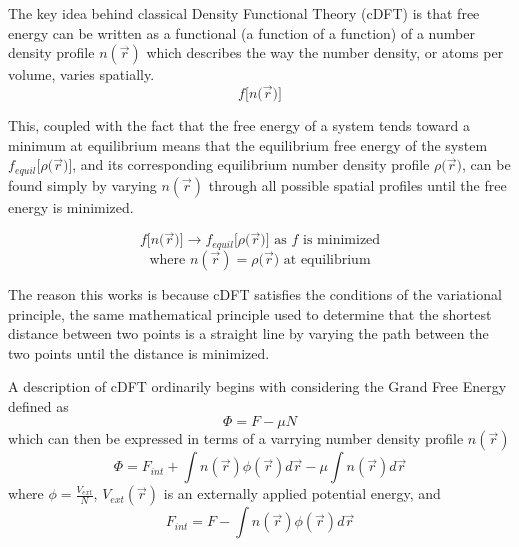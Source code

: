 \documentclass[12pt]{article}
\begin{document}
The key idea behind classical Density Functional Theory (cDFT) is that free energy can be written as a functional (a function of a function) of a number density profile $n(\vec{r})$ which describes the way the number density, or atoms per volume, varies spatially. 
\begin{displaymath}{f[n(}\vec{r}{)]}\end{displaymath}

This, coupled with the fact that the free energy of a system tends toward a minimum at equilibrium means that the equilibrium free energy of the system ${f_{equil}}{[}\rho{(}\vec{r}{)]}$, and its corresponding equilibrium number density profile $\rho{(}\vec{r}{)}$, can be found simply by varying $n(\vec{r})$ through all possible spatial profiles until the free energy is minimized. 

\begin{displaymath}{f[n(}\vec{r}{)]}\rightarrow{f_{equil}}{[}\rho{(}\vec{r}{)]}  \mbox{ as $f$ is minimized} \end{displaymath}
\begin{displaymath}{\mbox{where }  n(\vec{r})=\rho{(}\vec{r})  \mbox{ at equilibrium}}\end{displaymath}

The reason this works is because cDFT satisfies the conditions of the variational principle, the same mathematical principle used to determine that the shortest distance between two points is a straight line by varying the path between the two points until the distance is minimized.

A description of cDFT ordinarily begins with considering the Grand Free Energy defined as
\begin{equation}\Phi=F-\mu{N}\end{equation}
which can then be expressed in terms of a varrying number density profile $n(\vec r)$
\begin{equation}\label{GrandFE}\Phi= F_{int} +\int n(\vec{r})\phi{(\vec r)}d\vec{r}-\mu\int n(\vec r)d\vec{r}\end{equation}
where $\phi=\frac{V_{ext}}{N}$, $V_{ext}(\vec r)$ is an externally applied potential energy, and
\begin{equation}F_{int}= F -\int n(\vec{r})\phi{(\vec r)}d\vec{r}\end{equation}  
\end{document}
